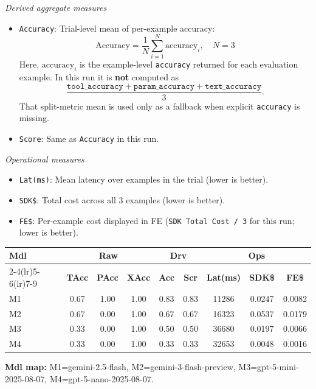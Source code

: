 \documentclass[11pt]{article}
\newcommand{\good}[1]{\cellcolor{ScaleGood}#1}
\newcommand{\midv}[1]{\cellcolor{ScaleMid}#1}
\newcommand{\bad}[1]{\cellcolor{ScaleBad}#1}
\begin{document}
\textit{Derived aggregate measures}
\begin{itemize}
    \item \texttt{Accuracy}: Trial-level mean of per-example accuracy:
    \[
    \mathrm{Accuracy}=\frac{1}{N}\sum_{i=1}^{N}\mathrm{accuracy}_i,\quad N=3
    \]
    Here, \(\mathrm{accuracy}_i\) is the example-level \texttt{accuracy} returned for each evaluation example.
    In this run it is \textbf{not} computed as
    \[
    \frac{\texttt{tool\_accuracy}+\texttt{param\_accuracy}+\texttt{text\_accuracy}}{3}.
    \]
    That split-metric mean is used only as a fallback when explicit \texttt{accuracy} is missing.
    \item \texttt{Score}: Same as \texttt{Accuracy} in this run.
\end{itemize}

\textit{Operational measures}
\begin{itemize}
    \item \texttt{Lat(ms)}: Mean latency over examples in the trial (lower is better).
    \item \texttt{SDK\$}: Total cost across all 3 examples (lower is better).
    \item \texttt{FE\$}: Per-example cost displayed in FE (\texttt{SDK Total Cost / 3} for this run; lower is better).
\end{itemize}

\begin{table}[H]
\centering
\scriptsize
\setlength{\tabcolsep}{4pt}
\begin{tabular}{lcccccccc}
\toprule
\textbf{Mdl} & \multicolumn{3}{c}{\textbf{Raw}} & \multicolumn{2}{c}{\textbf{Drv}} & \multicolumn{3}{c}{\textbf{Ops}} \\
\cmidrule(lr){2-4}\cmidrule(lr){5-6}\cmidrule(lr){7-9}
 & \textbf{TAcc} & \textbf{PAcc} & \textbf{XAcc} & \textbf{Acc} & \textbf{Scr} & \textbf{Lat(ms)} & \textbf{SDK\$} & \textbf{FE\$} \\
\midrule
M1 & \midv{0.67} & \good{1.00} & \good{1.00} & \good{0.83} & \good{0.83} & \good{11286} & \midv{0.0247} & \midv{0.0082} \\
M2 & \midv{0.67} & \bad{0.00} & \good{1.00} & \midv{0.67} & \midv{0.67} & \midv{16323} & \bad{0.0537} & \bad{0.0179} \\
M3 & \bad{0.33} & \bad{0.00} & \good{1.00} & \midv{0.50} & \midv{0.50} & \bad{36680} & \midv{0.0197} & \midv{0.0066} \\
M4 & \bad{0.33} & \bad{0.00} & \good{1.00} & \bad{0.33} & \bad{0.33} & \bad{32653} & \good{0.0048} & \good{0.0016} \\
\bottomrule
\end{tabular}
\end{table}
\vspace{-0.6em}
{\footnotesize\textbf{Mdl map:} M1=gemini-2.5-flash, M2=gemini-3-flash-preview, M3=gpt-5-mini-2025-08-07, M4=gpt-5-nano-2025-08-07.}
\end{document}
